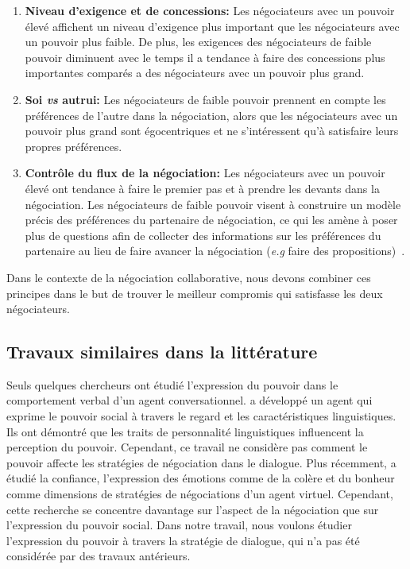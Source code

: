 \documentclass [french]{sig-alternate-05-2015}
\begin{document}
			\begin{enumerate}
				\item \textbf{Niveau d'exigence et de concessions:} Les négociateurs avec un pouvoir élevé affichent un niveau d'exigence plus important que les négociateurs avec un pouvoir plus faible. De plus, les exigences des négociateurs de faible pouvoir diminuent avec le temps il a tendance à faire des concessions plus importantes comparés a des négociateurs avec un pouvoir plus grand. \cite{de1995impact}
				
				\item \textbf{Soi \emph{vs} autrui:} Les négociateurs de faible pouvoir prennent en compte les préférences de l'autre dans la négociation, alors que les négociateurs avec un pouvoir plus grand sont égocentriques et ne s'intéressent qu'à satisfaire leurs propres préférences. \cite{fiske1993controlling,de1995impact}
				
				\item \textbf{Contrôle du flux de la négociation:}
				Les négociateurs avec un pouvoir élevé ont tendance à faire le premier pas \cite {magee2007power} et à prendre les devants dans la négociation. Les négociateurs de faible pouvoir visent à construire un modèle précis des préférences du partenaire de négociation, ce qui les amène à poser plus de questions afin de collecter des informations sur les préférences du partenaire au lieu de faire avancer la négociation (\emph{e.g}  faire des propositions)~\cite{de2004influence}. 
				
			\end{enumerate}
	
			Dans le contexte de la négociation collaborative, nous devons combiner ces principes dans le but de trouver le meilleur compromis qui satisfasse les deux négociateurs.
			
		\subsection{Travaux similaires dans la littérature}	
		Seuls quelques chercheurs ont étudié l'expression du pouvoir dans le comportement verbal d'un agent conversationnel. \cite {bee2010bossy} a développé un agent qui exprime le pouvoir social à travers le regard et les caractéristiques linguistiques. Ils ont démontré que les traits de personnalité linguistiques influencent la perception du pouvoir. Cependant, ce travail ne considère pas comment le pouvoir affecte les stratégies de négociation dans le dialogue. Plus récemment, \cite{broekens2010affective, de2015humans} a étudié la confiance, l'expression des émotions comme de la colère et du bonheur comme dimensions de stratégies de négociations d'un agent virtuel. Cependant, cette recherche se concentre davantage sur l'aspect de la négociation que sur l'expression du pouvoir social. Dans notre travail, nous voulons étudier l'expression du pouvoir à travers la stratégie de dialogue, qui n'a pas été considérée par des travaux antérieurs.
\end{document}
